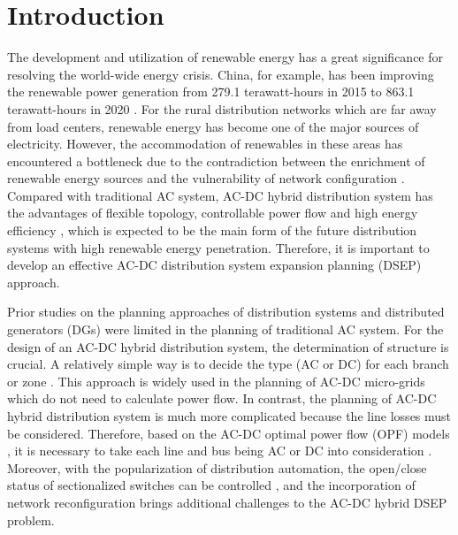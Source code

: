 \documentclass[a4paper,fleqn]{cas-dc}
\begin{document}
\begin{table*}[!t]
\begin{framed}
\selectfont
\printnomenclature
\end{framed}
\end{table*}

\section{Introduction}\label{}

The development and utilization of renewable energy has a 
great significance for resolving the world-wide energy crisis. China, for 
example, has been improving the renewable power generation from 279.1 
terawatt-hours in 2015 to 863.1 terawatt-hours in 2020 \cite{BP_2021_Report}.
For the rural distribution networks which are far away from load centers, 
renewable energy has become one of the major sources of electricity. However, 
the accommodation of renewables in these areas has encountered a bottleneck due 
to the contradiction between the enrichment of renewable energy sources 
and the vulnerability of network configuration \cite{Arriaga_2016_Long-Term}.
Compared with traditional AC system, AC-DC hybrid distribution system has the 
advantages of flexible topology, controllable power flow and high energy 
efficiency \cite{Yang_2020_Energy}, which is expected to be the main form of 
the future distribution systems with high renewable energy penetration. 
Therefore, it is important to develop an effective AC-DC distribution system 
expansion planning (DSEP) approach.

Prior studies on the planning approaches of distribution systems and distributed 
generators (DGs) \cite{Muñoz-Delgado_2015_Joint, Li_2016_Convex, 
Asensio_2017_Bi-Level, Muñoz-Delgado_2018_Distribution} were limited in the 
planning of traditional AC system. For the design of an AC-DC hybrid 
distribution system, the determination of structure is crucial. A relatively 
simple way is to decide the type (AC or DC) for each branch \cite{Lotfi_2017_AC} 
or zone \cite{Hamad_2019_Optimal}. This approach is widely used in the planning 
of AC-DC micro-grids which do not need to calculate power flow. In contrast, 
the planning of AC-DC hybrid distribution system is much more complicated 
because the line losses must be considered. Therefore, based on the AC-DC 
optimal power flow (OPF) models \cite{Ahmed_2018_Generalized, Yang_2018_Optimal, 
Bahrami_2017_Semidefinite, Ergun_2019_Optimal}, it is necessary to take each 
line and bus being AC or DC into consideration \cite{Ahmed_2018_Planning,
Wu_2018_bi-level}. Moreover, with the popularization of distribution automation,
the open/close status of sectionalized switches can be controlled
\cite{Eajal_2016_Stochastic, Ahmed_2019_Energy}, and the incorporation of 
network reconfiguration brings additional challenges to the AC-DC hybrid DSEP 
problem.
\end{document}
